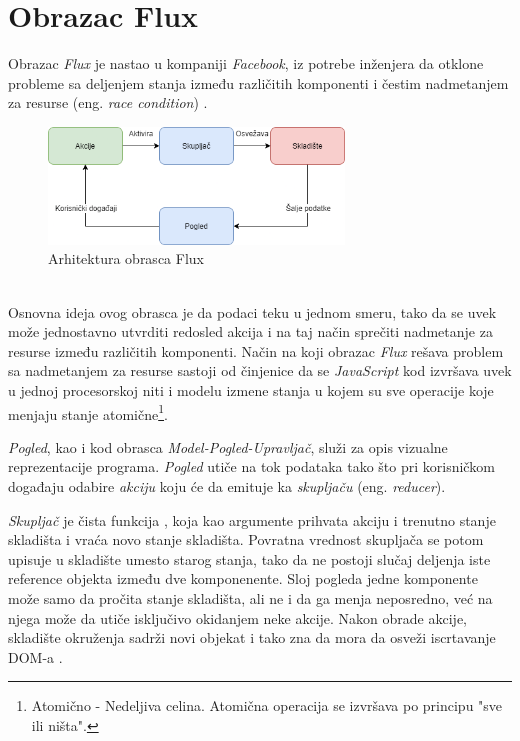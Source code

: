 \documentclass[12pt,oneside]{memoir}
\begin{document}
\section{Obrazac Flux}
Obrazac \emph{Flux} je nastao u kompaniji \emph{Facebook}, iz potrebe inženjera da otklone probleme sa 
deljenjem stanja između različitih komponenti i čestim nadmetanjem za resurse (eng. \emph{race condition}) \cite{raceCondition}.
\begin{figure}[!ht]
  \centering
  \includegraphics[width=0.7\textwidth]{slike/FLUX_pattern.png}
  \caption{Arhitektura obrasca Flux}
  \label{fig:flux}
\end{figure}
\\
Osnovna ideja ovog obrasca je da podaci teku u jednom smeru, tako da se uvek može jednostavno
utvrditi redosled akcija i na taj način sprečiti nadmetanje za resurse između različitih komponenti.
Način na koji obrazac \emph{Flux} rešava problem sa nadmetanjem za resurse sastoji od činjenice da se \emph{JavaScript}
kod izvršava uvek u jednoj procesorskoj niti i modelu izmene stanja u kojem su sve operacije koje menjaju stanje atomične\footnote{Atomično - Nedeljiva celina. Atomična operacija se izvršava po principu "sve ili ništa".}.

\emph{Pogled}, kao i kod obrasca \emph{Model-Pogled-Upravljač}, služi za opis vizualne reprezentacije programa.
\emph{Pogled} utiče na tok podataka tako što pri korisničkom događaju odabire \emph{akciju} koju će da emituje
ka \emph{skupljaču} (eng. \emph{reducer}).

\emph{Skupljač} je čista funkcija \cite{functionalProgramming}, koja kao argumente
prihvata akciju i trenutno stanje skladišta i vraća novo stanje skladišta.
Povratna vrednost skupljača se potom upisuje u skladište umesto starog stanja, tako da ne postoji slučaj deljenja iste reference objekta
između dve komponenente. Sloj pogleda jedne komponente može samo da pročita stanje skladišta, ali ne i da ga menja neposredno, već na njega može da utiče
isključivo okidanjem neke akcije. Nakon obrade akcije, skladište okruženja sadrži novi objekat i tako zna da mora da osveži iscrtavanje DOM-a \cite{DOM}.
\end{document}
